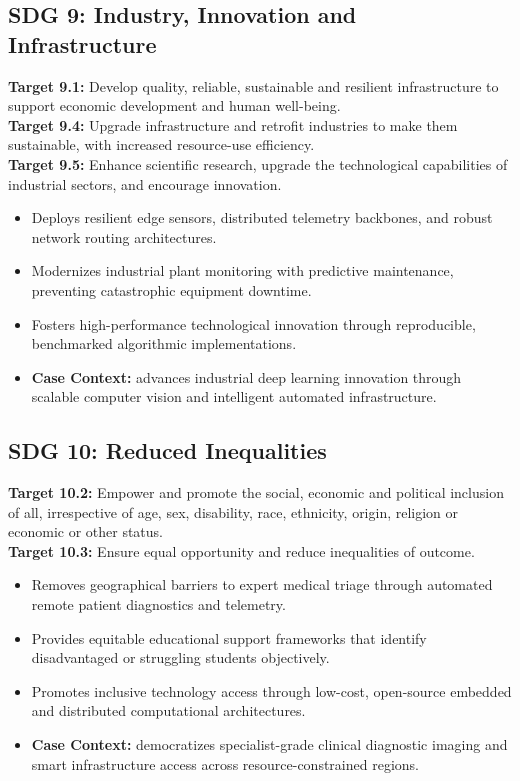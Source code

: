 \subsection{SDG 9: Industry, Innovation and Infrastructure}
\noindent\textbf{Target 9.1:} Develop quality, reliable, sustainable and resilient infrastructure to support economic development and human well-being. \\
\noindent\textbf{Target 9.4:} Upgrade infrastructure and retrofit industries to make them sustainable, with increased resource-use efficiency. \\
\noindent\textbf{Target 9.5:} Enhance scientific research, upgrade the technological capabilities of industrial sectors, and encourage innovation.
\begin{itemize}
  \item Deploys resilient edge sensors, distributed telemetry backbones, and robust network routing architectures.
  \item Modernizes industrial plant monitoring with predictive maintenance, preventing catastrophic equipment downtime.
  \item Fosters high-performance technological innovation through reproducible, benchmarked algorithmic implementations.
  \item \textbf{Case Context:} advances industrial deep learning innovation through scalable computer vision and intelligent automated infrastructure.
\end{itemize}

\subsection{SDG 10: Reduced Inequalities}
\noindent\textbf{Target 10.2:} Empower and promote the social, economic and political inclusion of all, irrespective of age, sex, disability, race, ethnicity, origin, religion or economic or other status. \\
\noindent\textbf{Target 10.3:} Ensure equal opportunity and reduce inequalities of outcome.
\begin{itemize}
  \item Removes geographical barriers to expert medical triage through automated remote patient diagnostics and telemetry.
  \item Provides equitable educational support frameworks that identify disadvantaged or struggling students objectively.
  \item Promotes inclusive technology access through low-cost, open-source embedded and distributed computational architectures.
  \item \textbf{Case Context:} democratizes specialist-grade clinical diagnostic imaging and smart infrastructure access across resource-constrained regions.
\end{itemize}

